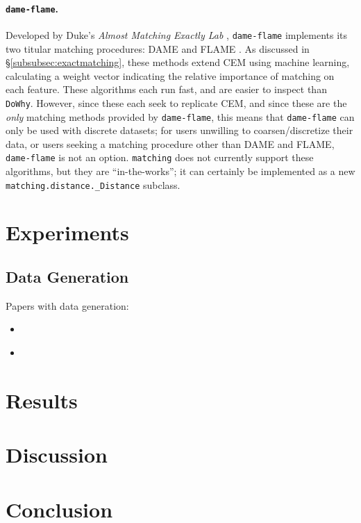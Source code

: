 \documentclass[11pt]{extarticle}
\begin{document}
\paragraph{\texttt{dame-flame}.} Developed by Duke's \emph{Almost Matching Exactly Lab} \parencite{gupta_dame-flame_2021}, \texttt{dame-flame} implements its two titular matching procedures: DAME \parencite{liu_interpretable_2019} and FLAME \parencite{wang_flame_2021}. As discussed in \S\ref{subsubsec:exactmatching}, these methods extend CEM using machine learning, calculating a weight vector  indicating the relative importance of matching on each feature. These algorithms each run fast, and are easier to inspect than \texttt{DoWhy}. However, since these each seek to replicate CEM, and since these are the \emph{only} matching methods provided by \texttt{dame-flame}, this means that \texttt{dame-flame} can only be used with discrete datasets; for users unwilling to coarsen/discretize their data, or users seeking a matching procedure other than DAME and FLAME, \texttt{dame-flame} is not an option. \texttt{matching} does not currently support these algorithms, but they are ``in-the-works''; it can certainly be implemented as a new \texttt{matching.distance.\_Distance} subclass.

\section{Experiments}

\subsection{Data Generation}

Papers with data generation:
\begin{itemize}
  \item \cite{austin_optimal_2011}
  \item \cite{stuart_prognostic_2013}
\end{itemize}

\section{Results}

\section{Discussion}

\section{Conclusion}



\cleardoublepage
{}
{}
\printbibliography
\end{document}
